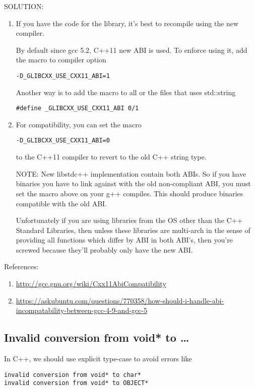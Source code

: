SOLUTION:
\begin{enumerate}
  \item  If you have the code for the library, it's best to recompile using the
  new compiler. 

By default since gcc 5.2, C++11 new ABI is used. To enforce using it, add the
macro to compiler option
\begin{verbatim}
-D_GLIBCXX_USE_CXX11_ABI=1
\end{verbatim}
Another way is to add the macro to all or the files that uses std::string
\begin{verbatim}
#define _GLIBCXX_USE_CXX11_ABI 0/1
\end{verbatim}

  \item For compatibility, you can set the macro
\begin{verbatim}
-D_GLIBCXX_USE_CXX11_ABI=0
\end{verbatim}
to the C++11 compiler to revert to the old C++ string type.

NOTE: New libstdc++ implementation contain both ABIs. So if you have binaries
you have to link against with the old non-compliant ABI, you must set the macro
above on your g++ compiles. This should produce binaries compatible with the old
ABI.   

Unfortunately if you are using libraries from the OS other than the C++ Standard
Libraries, then unless these libraries are multi-arch in the sense of
providing all functions which differ by ABI in both ABI's, then you're screwed
because they'll probably only have the new ABI.  

\end{enumerate}


References:
\begin{enumerate}
  \item \url{http://gcc.gnu.org/wiki/Cxx11AbiCompatibility}
  \item
  \url{https://askubuntu.com/questions/770358/how-should-i-handle-abi-incompatability-between-gcc-4-9-and-gcc-5}
\end{enumerate}

\subsection{Invalid conversion from void* to \ldots}

In C++, we should use explicit type-case to avoid errors like
\begin{verbatim}
invalid conversion from void* to char*
invalid conversion from void* to OBJECT*
\end{verbatim}

